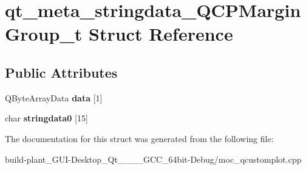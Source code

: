 \hypertarget{structqt__meta__stringdata__QCPMarginGroup__t}{}\section{qt\+\_\+meta\+\_\+stringdata\+\_\+\+Q\+C\+P\+Margin\+Group\+\_\+t Struct Reference}
\label{structqt__meta__stringdata__QCPMarginGroup__t}
\subsection*{Public Attributes}
\begin{DoxyCompactItemize}
\item 
\mbox{\label{structqt__meta__stringdata__QCPMarginGroup__t_a99abe4f941bb7fbdfd988480fd5e6dc9}} 
Q\+Byte\+Array\+Data {\bfseries data} \mbox{[}1\mbox{]}
\item 
\mbox{\label{structqt__meta__stringdata__QCPMarginGroup__t_aea2e8169d7b920f953fc3d240d03082b}} 
char {\bfseries stringdata0} \mbox{[}15\mbox{]}
\end{DoxyCompactItemize}


The documentation for this struct was generated from the following file\+:\begin{DoxyCompactItemize}
\item 
build-\/plant\+\_\+\+G\+U\+I-\/\+Desktop\+\_\+\+Qt\+\_\+\_\+\_\+\_\+\+G\+C\+C\+\_\+64bit-\/\+Debug/moc\+\_\+qcustomplot.\+cpp\end{DoxyCompactItemize}
